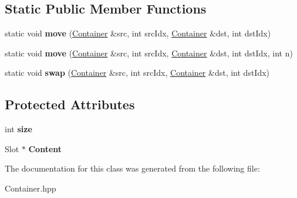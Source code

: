 \subsection*{Static Public Member Functions}
\begin{DoxyCompactItemize}
\item 
\mbox{\label{classContainer_a1b76b03655880a4e7abb5980edcf4d65}} 
static void {\bfseries move} (\hyperlink{classContainer}{Container} \&src, int src\+Idx, \hyperlink{classContainer}{Container} \&dst, int dst\+Idx)
\item 
\mbox{\label{classContainer_aeed5f1e2c7df9a0feb5dad9d28e6fcd0}} 
static void {\bfseries move} (\hyperlink{classContainer}{Container} \&src, int src\+Idx, \hyperlink{classContainer}{Container} \&dst, int dst\+Idx, int n)
\item 
\mbox{\label{classContainer_a37bc648372a93c699ea716f5ca879dd9}} 
static void {\bfseries swap} (\hyperlink{classContainer}{Container} \&src, int src\+Idx, \hyperlink{classContainer}{Container} \&dst, int dst\+Idx)
\end{DoxyCompactItemize}
\subsection*{Protected Attributes}
\begin{DoxyCompactItemize}
\item 
\mbox{\label{classContainer_af0f10443591de588f0a85b62f73ffc82}} 
int {\bfseries size}
\item 
\mbox{\label{classContainer_ab44f803cb2815683353619aaed2e70ac}} 
Slot $\ast$ {\bfseries Content}
\end{DoxyCompactItemize}


The documentation for this class was generated from the following file\+:\begin{DoxyCompactItemize}
\item 
Container.\+hpp\end{DoxyCompactItemize}
